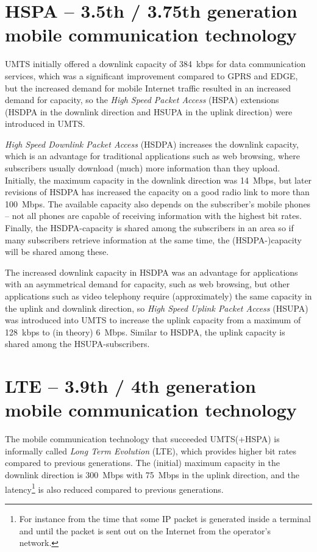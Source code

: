 \section{HSPA -- 3.5th / 3.75th generation mobile communication technology}
UMTS initially offered a downlink capacity of 384~kbps for data communication services, which was a significant improvement compared to GPRS and EDGE, but the increased demand for mobile Internet traffic resulted in an increased demand for capacity, so the \emph{High Speed Packet Access} (HSPA) extensions (HSDPA in the downlink direction and HSUPA in the uplink direction) were introduced in UMTS.

\emph{High Speed Downlink Packet Access} (HSDPA) increases the downlink capacity, which is an advantage for traditional applications such as web browsing, where subscribers usually download (much) more information than they upload. Initially, the maximum capacity in the downlink direction was 14~Mbps, but later revisions of HSDPA has increased the capacity on a good radio link to more than 100~Mbps. The available capacity also depends on the subscriber's mobile phones -- not all phones are capable of receiving information with the highest bit rates. Finally, the HSDPA-capacity is shared among the subscribers in an area so if many subscribers retrieve information at the same time, the (HSDPA-)capacity will be shared among these.

The increased downlink capacity in HSDPA was an advantage for applications with an asymmetrical demand for capacity, such as web browsing, but other applications such as video telephony require (approximately) the same capacity in the uplink and downlink direction, so \emph{High Speed Uplink Packet Access} (HSUPA) was introduced into UMTS to increase the uplink capacity from a maximum of 128~kbps to (in theory) 6~Mbps. Similar to HSDPA, the uplink capacity is shared among the HSUPA-subscribers.

\section{LTE -- 3.9th / 4th generation mobile communication technology}\label{sec:lte}
The mobile communication technology that succeeded UMTS(+HSPA) is informally called \emph{Long Term Evolution} (LTE), which provides higher bit rates compared to previous generations. The (initial) maximum capacity in the downlink direction is 300~Mbps with 75~Mbps in the uplink direction, and  the latency\footnote{For instance from the time that some IP packet is generated inside a terminal and until the packet is sent out on the Internet from the operator's network.} is also reduced compared to previous generations.

